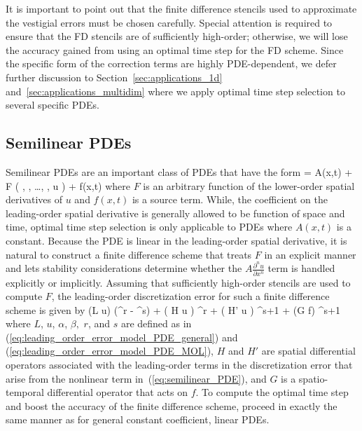 \documentclass[oneeqnum,onefignum,onetabnum,onethmnum]{siamltex}
\begin{document}
It is important to point out that the finite difference stencils used to 
approximate the vestigial errors must be chosen carefully.  Special attention 
is required to ensure that the FD stencils are of sufficiently high-order; 
otherwise, we will lose the accuracy gained from using an optimal time step 
for the FD scheme.  Since the specific form of the correction terms are 
highly PDE-dependent, we defer further discussion to 
Section~\ref{sec:applications_1d} and~\ref{sec:applications_multidim} where 
we apply optimal time step selection to several specific PDEs.


\subsection{Semilinear PDEs}
Semilinear PDEs are an important class of PDEs that have the form
\beq
   = A(x,t) 
  + F \left( ,
      , \ldots,
      , u \right)
  + f(x,t)
  \label{eq:semilinear_PDE}
\eeq
where $F$ is an arbitrary function of the lower-order spatial derivatives
of $u$ and $f(x,t)$ is a source term.  While, the coefficient on the 
leading-order spatial derivative is generally allowed to be function of 
space and time, optimal time step selection is only applicable to PDEs where
$A(x,t)$ is a constant.  Because the PDE is linear in the leading-order 
spatial derivative, it is natural to construct a finite difference scheme that 
treats $F$ in an explicit manner and lets stability considerations determine 
whether the $A \frac{\partial^n u}{\partial x^n}$ term is handled explicitly 
or implicitly.  Assuming that sufficiently high-order stencils are used to 
compute $F$, the leading-order discretization error for such a finite 
difference scheme is given by
\bea
  (L u) (\alpha \dx^r - \beta \dt^s) \dt
  + \left( H u \right) \dx^r \dt 
  + \left( H' u \right) \dt^{s+1}
  + (G f) \dt^{s+1}
  \label{eq:leading_order_error_semilinear_PDE_MOL}
\eea
where $L$, $u$, $\alpha$, $\beta,$ $r$, and $s$ are defined as in
(\ref{eq:leading_order_error_model_PDE_general}) and
(\ref{eq:leading_order_error_model_PDE_MOL}), $H$ and $H'$ are spatial 
differential operators associated with the leading-order terms in 
the discretization error that arise from the nonlinear term 
in~(\ref{eq:semilinear_PDE}), and $G$ is a spatio-temporal differential 
operator that acts on $f$.  To compute the optimal time step and boost
the accuracy of the finite difference scheme, proceed in exactly
the same manner as for general constant coefficient, linear PDEs.
\end{document}
